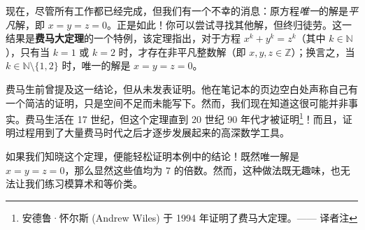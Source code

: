 现在，尽管所有工作都已经完成，但我们有一个不幸的消息：原方程\emph{唯一}的解是\emph{平凡}解，即 $x = y = z = 0$。正是如此！你可以尝试寻找其他解，但终归徒劳。这一结果是\textbf{费马大定理}的一个特例，该定理指出，对于方程 $x^k + y^k = z^k$（其中 $k \in \mathbb{N}$），只有当 $k = 1$ 或 $k = 2$ 时，才存在非平凡整数解（即 $x, y, z \in \mathbb{Z}$）；换言之，当 $k \in \mathbb{N} \setminus \{1, 2\}$ 时，唯一的解是 $x = y = z = 0$。

费马生前曾提及这一结论，但从未发表证明。他在笔记本的页边空白处声称自己有一个简洁的证明，只是空间不足而未能写下。然而，我们现在知道这很可能并非事实。费马生活在 17 世纪，但这个定理直到 20 世纪 90 年代才被证明\footnote{安德鲁·怀尔斯 (Andrew Wiles) 于 1994 年证明了费马大定理。—— 译者注}！而且，证明过程用到了大量费马时代之后才逐步发展起来的高深数学工具。

如果我们知晓这个定理，便能轻松证明本例中的结论！既然唯一解是 $x = y = z = 0$，那么显然这些值均为 $7$ 的倍数。然而，这种做法既无趣味，也无法让我们练习模算术和等价类。

